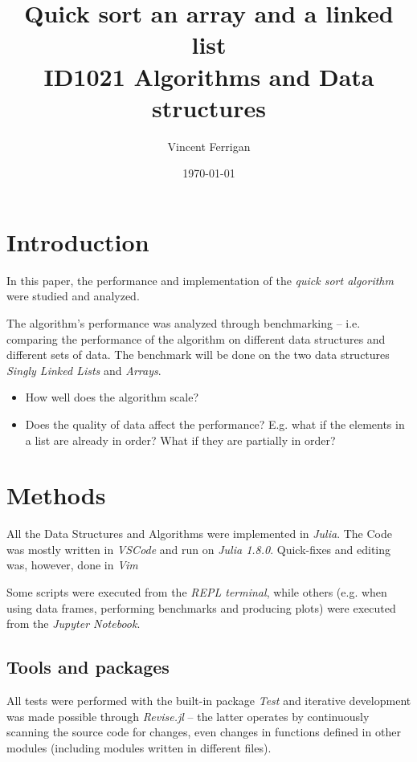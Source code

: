 \documentclass[a4paper, 11pt]{article}
\title{Quick sort an array and a linked list\\ \small{ID1021 Algorithms and Data structures}} %
\author{Vincent Ferrigan}
\date{\today}
\begin{document}
    \maketitle
    \section*{Introduction}
    \label{sec:introduction}
    In this paper, the performance and implementation of 
    the \emph{quick sort algorithm} were studied and analyzed. 

    The algorithm's performance was analyzed through benchmarking 
    -- i.e. comparing the performance of the algorithm 
    on different data structures and different sets of data. 
    The benchmark will be done on the two data structures  
    \emph{Singly Linked Lists} and \emph{Arrays}.
    \begin{itemize}
        \item How well does the algorithm scale?
        \item Does the quality of data affect the performance?
        E.g. what if the elements in a list are already in order? 
        What if they are partially in order?
    \end{itemize}

    \section*{Methods}
    \label{sec:methods}
    All the Data Structures and Algorithms were implemented in \emph{Julia}.
    The Code was mostly written in \emph{VSCode} and run on \emph{Julia 1.8.0}.
    Quick-fixes and editing was, however, done in \emph{Vim}

    Some scripts were executed from the \emph{REPL terminal},  while others (e.g.
    when using data frames, performing benchmarks and producing plots) 
    were executed from the \emph{Jupyter Notebook}. 
    
    \subsection*{Tools and packages}
    All tests were performed with the built-in package \emph{Test} and 
    iterative development was made possible through 
    \emph{Revise.jl} -- the latter operates by continuously
    scanning the source code for changes, even changes in functions defined in
    other modules (including modules written in different files).
    
\end{document}
